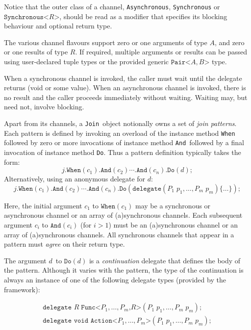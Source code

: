 \documentclass{article}
\newcommand{\cjoin}{{\texttt{Join}}}
\newcommand{\cpair}[2]{{\texttt{Pair<}#1,#2\texttt{>}}}
\newcommand{\dlongreturn}[2]{{\texttt{Func<}#2\texttt{,}#1\texttt{>}}}
\newcommand{\dlongreturnvoid}[1]{{\texttt{Action<}#1\texttt{>}}}
\newcommand{\dotwhen}{\texttt{.When}}
\newcommand{\dotand}{\texttt{.And}}
\newcommand{\dotdo}{\texttt{.Do}}
\newcommand{\When}{\texttt{When}}
\newcommand{\And}{\texttt{And}}
\newcommand{\Do}{\texttt{Do}}
\newcommand{\channel}{\ensuremath{c}}
\newcommand{\joinobj}{\ensuremath{j}}
\newcommand{\delegate}{\ensuremath{d}}
\newcommand{\delegatekw}{\texttt{delegate}}
\newcommand{\tvara}{\ensuremath{A}}
\newcommand{\tvarb}{\ensuremath{B}}
\newcommand{\tvarr}{\ensuremath{R}}
\begin{document}
Notice that the outer class of a channel, \texttt{Asynchronous}, \texttt{Synchronous} or $\texttt{Synchronous<}$\tvarr$\texttt{>}$,
should be read as a modifier that specifies its blocking behaviour and optional return type.

The various channel flavours support zero or one arguments of type \texttt\tvara, and zero or one results of type \texttt\tvarr.
If required, multiple arguments or results can be passed using user-declared tuple types or the provided generic
$\cpair{\tvara}{\tvarb}$ type.

When a synchronous channel is invoked, the caller
must wait until the delegate returns (void or some value). 
When an asynchronous channel is invoked, there is no result and the
caller proceeds immediately without waiting. Waiting  may, but need not, involve blocking.

Apart from its channels, a \cjoin\ object notionally owns a set of \emph{join patterns}. Each pattern is defined by invoking an overload of 
the instance method \When\, followed by zero or more invocations of instance method \And\, followed by 
a final invocation of instance method \Do. Thus a pattern definition typically takes the form:
\[
  \joinobj\dotwhen(\channel_1)\dotand(\channel_2) \cdots \dotand(\channel_n)\dotdo(\delegate);
\]
Alternatively, using an anonymous delegate for \delegate: 
\[
  \joinobj\dotwhen(\channel_1)\dotand(\channel_2) \cdots \dotand(\channel_n)\dotdo(\delegatekw(P_1\;p_1, \ldots, P_m\;p_m)\{\ldots\});
\]

Here, the initial argument $\channel_1$ to $\When(\channel_1)$ may be a synchronous or asynchronous channel or an array of (a)synchronous channels.
Each subsequent argument  $\channel_i$ to $\And(\channel_i)$ (for $i>1$)  must be an (a)synchronous channel or an array of (a)synchronous channels.
All synchronous channels that appear in a pattern must \emph{agree} on their return type.

The argument \delegate\ to $\Do(\delegate)$ is a \emph{continuation} delegate that defines the body of the pattern.
Although it varies with the pattern,  the type of the continuation is always an instance of one of the following delegate types (provided by the framework):

\[ 
\begin{array}{l}
  \texttt{delegate } \tvarr\; \dlongreturn{\tvarr}{P_1,\ldots,P_m}(P_1\;p_1, \ldots,  P_m\;p_m );\\
  \texttt{delegate void } \dlongreturnvoid{P_1,\ldots,P_m}(P_1\;p_1, \ldots,  P_m\;p_m );\\
\end{array}
\]
\end{document}
